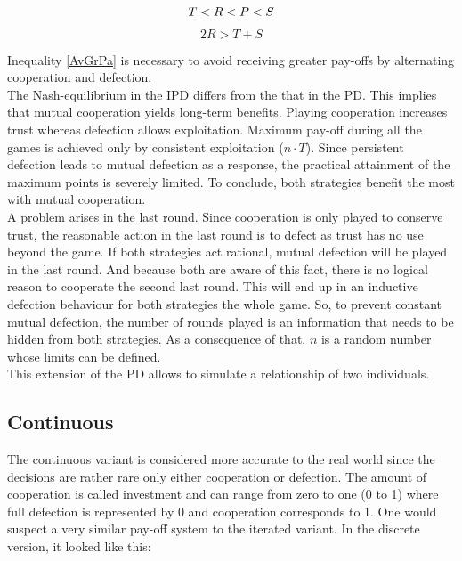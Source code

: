 \documentclass{article}
\begin{document}
\begin{equation}
T < R < P < S\\
\end{equation}
\begin{equation}\label{AvGrPa}
2R > T + S
\end{equation}

Inequality \eqref{AvGrPa} is necessary to avoid receiving greater pay-offs by alternating cooperation and defection.\\
The Nash-equilibrium in the IPD differs from the that in the PD.
This implies that mutual cooperation yields long-term benefits.
Playing cooperation increases trust whereas defection allows exploitation.
Maximum pay-off during all the games is achieved only by consistent exploitation ($n \cdot T$).
Since persistent defection leads to mutual defection as a response, the practical attainment of the maximum points is severely limited.
To conclude, both strategies benefit the most with mutual cooperation.\\
A problem arises in the last round.
Since cooperation is only played to conserve trust, the reasonable action in the last round is to defect as trust has no use beyond the game.
If both strategies act rational, mutual defection will be played in the last round.
And because both are aware of this fact, there is no logical reason to cooperate the second last round.
This will end up in an inductive defection behaviour for both strategies the whole game.
So, to prevent constant mutual defection, the number of rounds played is an information that needs to be hidden from both strategies.
As a consequence of that, $n$ is a random number whose limits can be defined.\\
This extension of the PD allows to simulate a relationship of two individuals.

\subsection{Continuous}

The continuous variant is considered more accurate to the real world since the decisions are rather rare only either cooperation or defection.
The amount of cooperation is called investment and can range from zero to one (0 to 1) where full defection is represented by 0 and cooperation corresponds to 1.
One would suspect a very similar pay-off system to the iterated variant.
In the discrete version, it looked like this:
\end{document}
